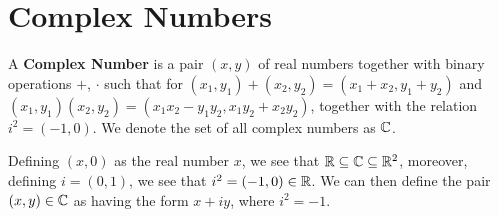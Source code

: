 
\section{Complex Numbers}
\label{section1}

\begin{definition}
    A \textbf{Complex Number} is a pair $(x,y)$ of real numbers together with 
    binary operations $+$,  $\cdot$ such that for $(x_1,y_1)+(x_2,y_2)=
    (x_1+x_2,y_1+y_2)$ and $(x_1,y_1)(x_2,y_2)=(x_1x_2-y_1y_2,x_1y_2+x_2y_2)$, 
    together with the relation $i^2=(-1,0)$. We denote the set of all complex 
    numbers as  $\mathbb{C}$.
\end{definition}

Defining $(x,0)$ as the real number  $x$, we see that  $\mathbb{R} \subseteq \mathbb{C} 
\subseteq \mathbb{R}^2$, moreover, defining  $i=(0,1)$, we see that  $i^2=(-1,0) \in \mathbb{R}$. 
We can then define the pair  $(x,y) \in \mathbb{C}$ as having the form $x+iy$, where  
$i^2=-1$.

